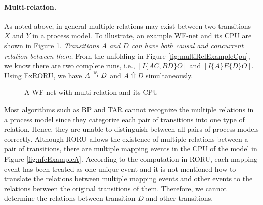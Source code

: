 \documentclass{llncs}
\begin{document}
\paragraph{\textbf{Multi-relation.}} As noted above, in general multiple relations may exist between two transitions $X$ and $Y$ in a process model. To illustrate, an example WF-net and its CPU are shown in Figure \ref{fig:exampleMultiRelation}. \textit{Transitions $A$ and $D$ can have both causal and concurrent relation between them.} From the unfolding in Figure \ref{fig:multiRelExampleCpu}, we know there are two complete runs, i.e., $[I\{AC,BD\}O]$ and $[I\{A\}E\{D\}O]$. Using ExRORU, we have $A\overset{\text{\tiny{IS}}}{\rightarrow}D$ and $A\Uparrow D$ simultaneously.
\\
\begin{figure}[htbp]
\centering
{}
\caption{A WF-net with multi-relation and its CPU\label{fig:exampleMultiRelation}}
\end{figure}

Most algorithms such as BP and TAR cannot recognize the multiple relations in a process model since they categorize each pair of transitions into one type of relation. Hence, they are unable to distinguish between all pairs of process models correctly. Although RORU allows the existence of multiple relations between a pair of transitions, there are multiple mapping events in the CPU of the model in Figure \ref{fig:nfcExampleA}. According to the computation in RORU, each mapping event has been treated as one unique event and it is not mentioned how to translate the relations between multiple mapping events and other events to the relations between the original transitions of them. Therefore, we cannot determine the relations between transition $D$ and other transitions.
\end{document}

